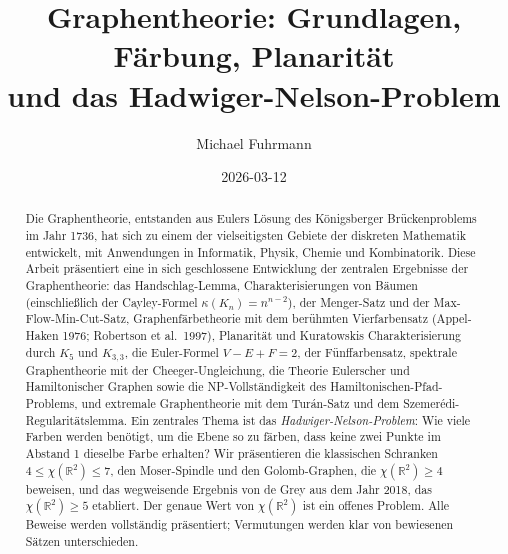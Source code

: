 \documentclass[12pt,a4paper]{amsart}
\theoremstyle{definition}
\theoremstyle{remark}
\newcommand{\R}{\mathbb{R}}
\newcommand{\chr}{\chi}
\begin{document}
\title{Graphentheorie: Grundlagen, Färbung, Planarität\\
       und das Hadwiger-Nelson-Problem}

\author{Michael Fuhrmann}

\address{Specialist Mathematics Project, Build 145}


\date{2026-03-12}



\begin{abstract}
Die Graphentheorie, entstanden aus Eulers Lösung des Königsberger Brückenproblems
im Jahr 1736, hat sich zu einem der vielseitigsten Gebiete der diskreten
Mathematik entwickelt, mit Anwendungen in Informatik, Physik, Chemie und
Kombinatorik. Diese Arbeit präsentiert eine in sich geschlossene Entwicklung
der zentralen Ergebnisse der Graphentheorie: das Handschlag-Lemma,
Charakterisierungen von Bäumen (einschließlich der Cayley-Formel
$\kappa(K_n) = n^{n-2}$), der Menger-Satz und der Max-Flow-Min-Cut-Satz,
Graphenfärbetheorie mit dem berühmten Vierfarbensatz (Appel-Haken 1976;
Robertson et al.\ 1997), Planarität und Kuratowskis Charakterisierung durch
$K_5$ und $K_{3,3}$, die Euler-Formel $V - E + F = 2$, der Fünffarbensatz,
spektrale Graphentheorie mit der Cheeger-Ungleichung, die Theorie Eulerscher
und Hamiltonischer Graphen sowie die NP-Vollständigkeit des
Hamiltonischen-Pfad-Problems, und extremale Graphentheorie mit dem Turán-Satz
und dem Szemerédi-Regularitätslemma. Ein zentrales Thema ist das
\emph{Hadwiger-Nelson-Problem}: Wie viele Farben werden benötigt, um die Ebene
so zu färben, dass keine zwei Punkte im Abstand 1 dieselbe Farbe erhalten?
Wir präsentieren die klassischen Schranken $4 \le \chr(\R^2) \le 7$, den
Moser-Spindle und den Golomb-Graphen, die $\chr(\R^2) \ge 4$ beweisen, und
das wegweisende Ergebnis von de Grey aus dem Jahr 2018, das $\chr(\R^2) \ge 5$
etabliert. Der genaue Wert von $\chr(\R^2)$ ist ein offenes Problem. Alle
Beweise werden vollständig präsentiert; Vermutungen werden klar von bewiesenen
Sätzen unterschieden.
\end{abstract}

\maketitle
\end{document}
